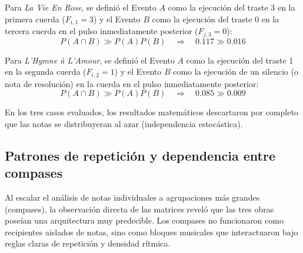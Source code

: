 \documentclass{article}
\theoremstyle{plain}
\theoremstyle{definition}
\begin{document}
Para \textit{La Vie En Rose}, se definió el Evento $A$ como la ejecución del traste 3 en la primera cuerda ($F_{i,1} = 3$) y el Evento $B$ como la ejecución del traste 0 en la tercera cuerda en el pulso inmediatamente posterior ($F_{j,3} = 0$):
\[
    P(A \cap B) \gg P(A)P(B) \quad \Longrightarrow \quad 0.117 \gg 0.016
\]

Para \textit{L'Hymne à L'Amour}, se definió el Evento $A$ como la ejecución del traste 1 en la segunda cuerda ($F_{i,2} = 1$) y el Evento $B$ como la ejecución de un silencio (o nota de resolución) en la cuerda en el pulso inmediatamente posterior:
\[
    P(A \cap B) \gg P(A)P(B) \quad \Longrightarrow \quad 0.085 \gg 0.009
\]

En los tres casos evaluados, los resultados matemáticos descartaron por completo que las notas se distribuyeran al azar (independencia estocástica).

\subsection*{Patrones de repetición y dependencia entre compases}

Al escalar el análisis de notas individuales a agrupaciones más grandes (compases), la observación directa de las matrices reveló que las tres obras poseían una arquitectura muy predecible. Los compases no funcionaron como recipientes aislados de notas, sino como bloques musicales que interactuaron bajo reglas claras de repetición y densidad rítmica.
\end{document}
